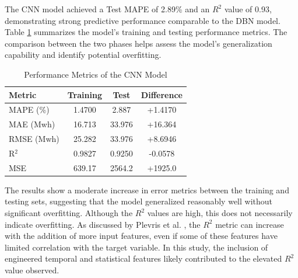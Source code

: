  The CNN model achieved a Test MAPE of 2.89\% and an $R^2$ value of 0.93, demonstrating strong predictive performance comparable to the DBN model. Table \ref{tab:cnn_performance_diff} summarizes the model’s training and testing performance metrics. The comparison between the two phases helps assess the model’s generalization capability and identify potential overfitting.
 \begin{table}[h!]
 	\small
 	\centering
 	\caption{Performance Metrics of the CNN Model}
 	\label{tab:cnn_performance_diff}
 	\begin{tabular}{lccc}
 		\hline
 		\textbf{Metric} & \textbf{Training} & \textbf{Test} & \textbf{Difference} \\
 		\hline
 		MAPE (\%) & 1.4700 & 2.887 & +1.4170 \\
 		MAE (Mwh) & 16.713 & 33.976& +16.364 \\
 		RMSE (Mwh) & 25.282 & 33.976 & +8.6946 \\
 		R$^2$ & 0.9827 & 0.9250 & -0.0578 \\
 		MSE & 639.17 & 2564.2 & +1925.0 \\
 		\hline
 	\end{tabular}
 \end{table}
The results show a moderate increase in error metrics between the training and testing sets, suggesting that the model generalized reasonably well without significant overfitting. Although the $R^2$ values are high, this does not necessarily indicate overfitting. As discussed by Plevris et al. \cite{plevris2022investigation}, the $R^2$ metric can increase with the addition of more input features, even if some of these features have limited correlation with the target variable. In this study, the inclusion of engineered temporal and statistical features likely contributed to the elevated $R^2$ value observed.
